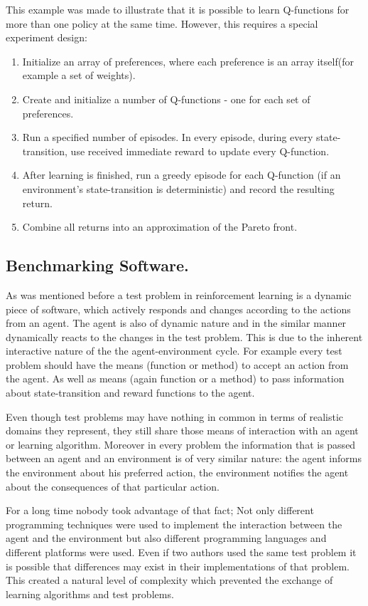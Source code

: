{{This example was made to illustrate that it is possible to learn Q-functions for more than one policy at the same time. However, this requires a special experiment design:
\begin{enumerate}
  \item Initialize an array of preferences, where each preference is an array itself(for example a set of weights).
  \item Create and initialize a number of Q-functions - one for each set of preferences.
  \item Run a specified number of episodes. In every episode, during every state-transition, use received immediate reward to update every Q-function.
  \item After learning is finished, run a greedy episode for each Q-function (if an environment's state-transition is deterministic) and record the resulting return.
  \item Combine all returns into an approximation of the Pareto front.
\end{enumerate}

\subsection{Benchmarking Software.}
As was mentioned before a test problem in reinforcement learning is a dynamic piece of software, which actively responds and changes according to the actions from an agent. The agent is also of dynamic nature and in the similar manner dynamically reacts to the changes in the test problem. This is due to the inherent interactive nature of the the agent-environment cycle. For example every test problem should have the means (function or method) to accept an action from the agent. As well as means (again function or a method) to pass information about state-transition and reward functions to the agent.

Even though test problems may have nothing in common in terms of realistic domains they represent, they still share those means of interaction with an agent or learning algorithm. Moreover in every problem the information that is passed between an agent and an environment is of very similar nature: the agent informs the environment about his preferred action, the environment notifies the agent about the consequences of that particular action.

For a long time nobody took advantage of that fact; Not only different programming techniques were used to implement the interaction between the agent and the environment but also different programming languages and different platforms were used. Even if two authors used the same test problem it is possible that differences may exist in their implementations of that problem. This created a natural level of complexity which prevented the exchange of learning algorithms and test problems.

}}
